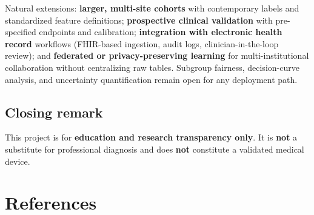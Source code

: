 \documentclass[11pt,a4paper]{article}
\begin{document}
Natural extensions: \textbf{larger, multi-site cohorts} with contemporary labels and standardized feature definitions; \textbf{prospective clinical validation} with pre-specified endpoints and calibration; \textbf{integration with electronic health record} workflows (FHIR-based ingestion, audit logs, clinician-in-the-loop review); and \textbf{federated or privacy-preserving learning} for multi-institutional collaboration without centralizing raw tables. Subgroup fairness, decision-curve analysis, and uncertainty quantification remain open for any deployment path.

\subsection{Closing remark}

This project is for \textbf{education and research transparency only}. It is \textbf{not} a substitute for professional diagnosis and does \textbf{not} constitute a validated medical device.

\section{References}
\label{sec:references}
\end{document}
